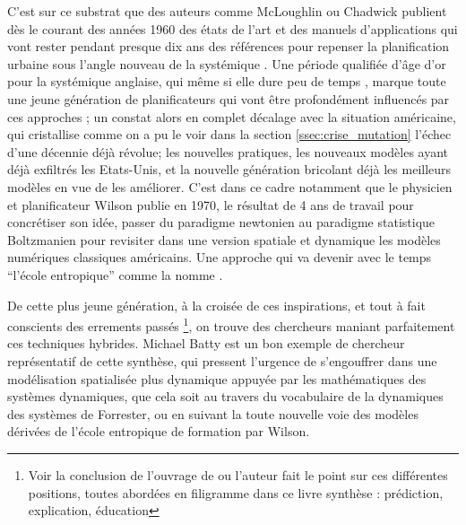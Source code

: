C'est sur ce substrat \autocite[253]{Batty1978} que des auteurs comme McLoughlin ou Chadwick publient dès le courant des années 1960 des états de l'art et des manuels d'applications qui vont rester pendant presque dix ans des références pour repenser la planification urbaine sous l'angle nouveau de la systémique \autocite[719]{Davies1997}. Une période qualifiée d'âge d'or pour la systémique anglaise, qui même si elle dure peu de temps \autocites[726-727]{Davies1997}{McLoughin1985}, marque toute une jeune génération de planificateurs qui vont être profondément influencés par ces approches \autocite[256]{Batty1978}; un constat alors en complet décalage avec la situation américaine, qui cristallise comme on a pu le voir dans la section \ref{ssec:crise_mutation} l'échec d'une décennie déjà révolue; les nouvelles pratiques, les nouveaux modèles ayant déjà exfiltrés les Etats-Unis, et la nouvelle génération bricolant déjà les meilleurs modèles en vue de les améliorer. C'est dans ce cadre notamment que le physicien et planificateur Wilson publie en 1970, le résultat de 4 ans de travail pour concrétiser son idée, passer du paradigme newtonien au paradigme statistique Boltzmanien pour revisiter dans une version spatiale et dynamique les modèles numériques classiques américains. \autocite{Wilson2010} Une approche qui va devenir avec le temps \enquote{l'école entropique} comme la nomme \textcite{Guermond1984}.

De cette plus jeune génération, à la croisée de ces inspirations, et tout à fait conscients des errements passés \footnote{Voir la conclusion de l'ouvrage de \textcite[357]{Batty1976} ou l'auteur fait le point sur ces différentes positions, toutes abordées en filigramme dans ce livre synthèse : prédiction, explication, éducation }, on trouve des chercheurs maniant parfaitement ces techniques hybrides. Michael Batty est un bon exemple de chercheur représentatif de cette synthèse, qui pressent l'urgence de s'engouffrer dans une modélisation spatialisée plus dynamique \autocite{Batty1971,Batty1972} appuyée par les mathématiques des systèmes dynamiques, que cela soit au travers du vocabulaire de la dynamiques des systèmes de Forrester, ou en suivant la toute nouvelle voie des modèles dérivées de l'école entropique de formation par Wilson.


